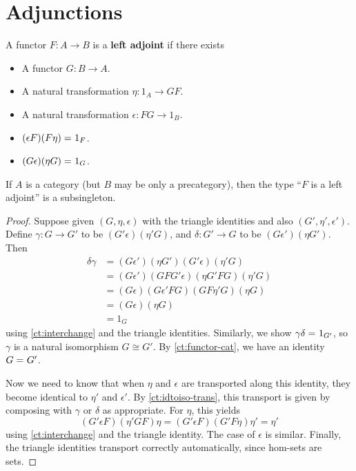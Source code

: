 \section{Adjunctions}
\label{sec:adjunctions}

\begin{defn}
  A functor $F:A\to B$ is a \textbf{left adjoint} if there exists
  \begin{itemize}
  \item A functor $G:B\to A$.
  \item A natural transformation $\eta:1_A \to GF$.
  \item A natural transformation $\epsilon:FG\to 1_B$.
  \item $(\epsilon F)(F\eta) =_{} 1_F$.
  \item $(G\epsilon)(\eta G) =_{} 1_G$.
  \end{itemize}
\end{defn}

\begin{lem}\label{ct:adjprop}
  If $A$ is a category (but $B$ may be only a precategory), then the type ``$F$ is a left adjoint'' is a subsingleton.
\end{lem}
\begin{proof}
  Suppose given $(G,\eta,\epsilon)$ with the triangle identities and also $(G',\eta',\epsilon')$.
  Define $\gamma:G\to G'$ to be $(G'\epsilon)(\eta' G)$, and $\delta:G'\to G$ to be $(G\epsilon')(\eta G')$.
  Then
  \begin{align*}
    \delta\gamma &=
    (G\epsilon')(\eta G')(G'\epsilon)(\eta'G)\\
    &= (G\epsilon')(G F G'\epsilon)(\eta G' F G)(\eta'G)\\
    &= (G\epsilon)(G\epsilon'FG)(G F \eta' G)(\eta G)\\
    &= (G\epsilon)(\eta G)\\
    &= 1_G
  \end{align*}
  using \autoref{ct:interchange} and the triangle identities.
  Similarly, we show $\gamma\delta =_{} 1_{G'}$, so $\gamma$ is a natural isomorphism $G\cong G'$.
  By \autoref{ct:functor-cat}, we have an identity $G =_{} G'$.

  Now we need to know that when $\eta$ and $\epsilon$ are transported along this identity, they become identical to $\eta'$ and $\epsilon'$.
  By \autoref{ct:idtoiso-trans}, this transport is given by composing with $\gamma$ or $\delta$ as appropriate.
  For $\eta$, this yields
  \begin{equation*}
    (G'\epsilon F)(\eta'GF)\eta
    = (G'\epsilon F)(G'F\eta)\eta'
    = \eta'
  \end{equation*}
  using \autoref{ct:interchange} and the triangle identity.
  The case of $\epsilon$ is similar.
  Finally, the triangle identities transport correctly automatically, since hom-sets are sets.
\end{proof}

